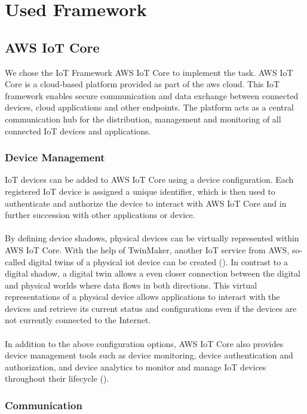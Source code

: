 \chapter{Used Framework}

\section{AWS IoT Core}
We chose the IoT Framework AWS IoT Core to implement the task. 
AWS IoT Core is a cloud-based platform provided as part of the \ac{aws} cloud.
This IoT framework enables secure communication and data exchange between connected devices, cloud applications and other endpoints.
The platform acts as a central communication hub for the distribution, management and monitoring of all connected IoT devices and applications.

\subsection{Device Management}

IoT devices can be added to AWS IoT Core using a device configuration. 
Each registered IoT device is assigned a unique identifier, which is then used to authenticate and authorize the device to interact with AWS IoT Core and in further succession with other applications or device.
\\
\\
By defining device shadows, physical devices can be virtually represented within AWS IoT Core. 
With the help of TwinMaker, another IoT service from AWS, so-called digital twins of a physical \ac{iot} device can be created ({\cite{ref01}}).
In contrast to a digital shadow, a digital twin allows a even closer connection between the digital and physical worlds where data flows in both directions.
This virtual representations of a physical device allows applications to interact with the devices and retrieve its current status and configurations even if the devices are not currently connected to the Internet. 
\\
\\
In addition to the above configuration options, AWS IoT Core also provides device management tools such as device monitoring, device authentication and authorization, and device analytics to monitor and manage IoT devices throughout their lifecycle ({\cite{ref02}}).

\subsection{Communication}

